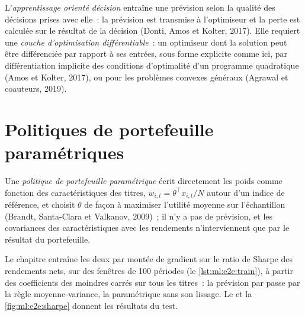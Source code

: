 \begin{definition}\label{def:ml:from-prediction-to-portfolio:dfl}
L'\emph{apprentissage orienté décision} entraîne une prévision selon la qualité des décisions prises avec
elle~: la prévision est transmise à l'optimiseur et la perte est calculée sur le résultat de la décision (Donti, Amos et Kolter,
2017). Elle requiert une \emph{couche d'optimisation différentiable}~: un optimiseur dont la solution
peut être différenciée par rapport à ses entrées, sous forme explicite comme ici, par différentiation implicite des conditions
d'optimalité d'un programme quadratique (Amos et Kolter, 2017), ou pour les problèmes convexes généraux (Agrawal et coauteurs, 2019).
\end{definition}

\section{Politiques de portefeuille paramétriques}

\begin{definition}\label{def:ml:from-prediction-to-portfolio:ppp}
Une \emph{politique de portefeuille paramétrique} écrit directement les poids comme fonction des
caractéristiques des titres, $w_{i,t} = \theta^\top x_{i,t}/N$ autour d'un indice de référence, et choisit $\theta$ de façon à maximiser
l'utilité moyenne sur l'échantillon (Brandt, Santa-Clara et Valkanov, 2009)~; il n'y a pas de prévision, et les covariances des caractéristiques avec les rendements
n'interviennent que par le résultat du portefeuille.
\end{definition}

Le chapitre entraîne les deux par montée de gradient sur le ratio de Sharpe des rendements nets, sur des fenêtres de 100 périodes
(le \cref{lst:ml:e2e:train}), à partir des coefficients des moindres carrés sur tous les titres~: la prévision par  passe par la
règle moyenne-variance, la  paramétrique sans son lissage. Le  et la \cref{fig:ml:e2e:sharpe} donnent les
résultats du test.

